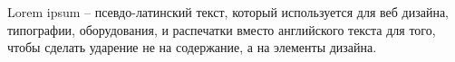 Lorem ipsum – псевдо-латинский текст, который используется для веб дизайна, типографии, оборудования,
и распечатки вместо английского текста для того, чтобы сделать ударение не на содержание,
а на элементы дизайна.